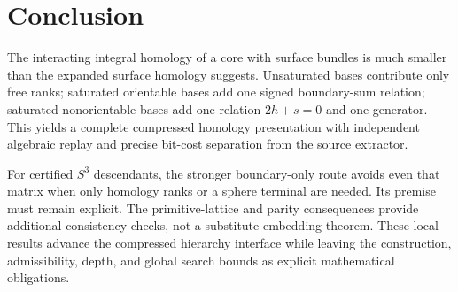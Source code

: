 \documentclass[11pt]{article}
\theoremstyle{definition}
\theoremstyle{remark}
\begin{document}
\section{Conclusion}
The interacting integral homology of a core with surface bundles is much
smaller than the expanded surface homology suggests. Unsaturated bases
contribute only free ranks; saturated orientable bases add one signed
boundary-sum relation; saturated nonorientable bases add one relation
$2h+s=0$ and one generator. This yields a complete compressed homology
presentation with independent algebraic replay and precise bit-cost
separation from the source extractor.

For certified $S^3$ descendants, the stronger boundary-only route avoids even
that matrix when only homology ranks or a sphere terminal are needed. Its
premise must remain explicit. The primitive-lattice and parity consequences
provide additional consistency checks, not a substitute embedding theorem.
These local results advance the compressed hierarchy interface while leaving
the construction, admissibility, depth, and global search bounds as explicit
mathematical obligations.
\end{document}
